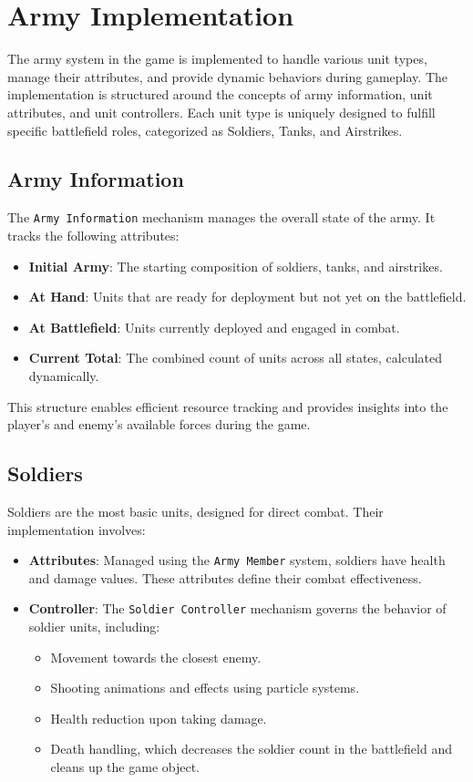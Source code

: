 \chapter{Army Implementation}

The army system in the game is implemented to handle various unit types, manage their attributes, and provide dynamic behaviors during gameplay. The implementation is structured around the concepts of army information, unit attributes, and unit controllers. Each unit type is uniquely designed to fulfill specific battlefield roles, categorized as Soldiers, Tanks, and Airstrikes.

\section{Army Information}
The \texttt{Army Information} mechanism manages the overall state of the army. It tracks the following attributes:
\begin{itemize}
    \item \textbf{Initial Army}: The starting composition of soldiers, tanks, and airstrikes.
    \item \textbf{At Hand}: Units that are ready for deployment but not yet on the battlefield.
    \item \textbf{At Battlefield}: Units currently deployed and engaged in combat.
    \item \textbf{Current Total}: The combined count of units across all states, calculated dynamically.
\end{itemize}
This structure enables efficient resource tracking and provides insights into the player's and enemy's available forces during the game.

\section{Soldiers}
Soldiers are the most basic units, designed for direct combat. Their implementation involves:
\begin{itemize}
    \item \textbf{Attributes}: Managed using the \texttt{Army Member} system, soldiers have health and damage values. These attributes define their combat effectiveness.
    \item \textbf{Controller}: The \texttt{Soldier Controller} mechanism governs the behavior of soldier units, including:
    \begin{itemize}
        \item Movement towards the closest enemy.
        \item Shooting animations and effects using particle systems.
        \item Health reduction upon taking damage.
        \item Death handling, which decreases the soldier count in the battlefield and cleans up the game object.
    \end{itemize}
\end{itemize}

